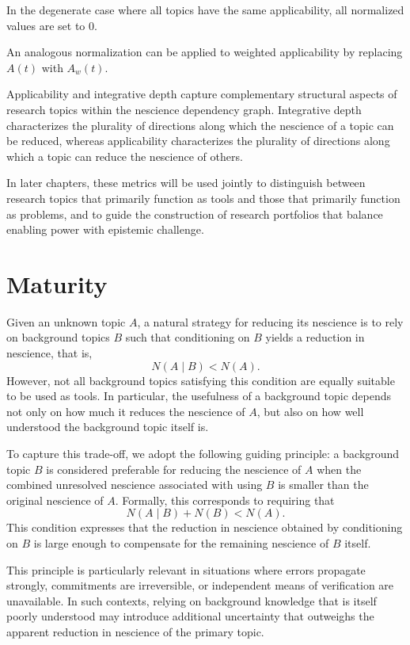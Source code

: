 \noindent
In the degenerate case where all topics have the same applicability, all normalized values are set to $0$.

An analogous normalization can be applied to weighted applicability by replacing $A(t)$ with $A_w(t)$.

Applicability and integrative depth capture complementary structural aspects of research topics within the nescience dependency graph. Integrative depth characterizes the plurality of directions along which the nescience of a topic can be reduced, whereas applicability characterizes the plurality of directions along which a topic can reduce the nescience of others.

In later chapters, these metrics will be used jointly to distinguish between research topics that primarily function as tools and those that primarily function as problems, and to guide the construction of research portfolios that balance enabling power with epistemic challenge.

%
%

\section{Maturity}
\label{sec:maturity}

Given an unknown topic $A$, a natural strategy for reducing its nescience is to rely on background topics $B$ such that conditioning on $B$ yields a reduction in nescience, that is,
\[
N(A \mid B) < N(A).
\]
However, not all background topics satisfying this condition are equally suitable to be used as tools. In particular, the usefulness of a background topic depends not only on how much it reduces the nescience of $A$, but also on how well understood the background topic itself is.

To capture this trade-off, we adopt the following guiding principle: a background topic $B$ is considered preferable for reducing the nescience of $A$ when the combined unresolved nescience associated with using $B$ is smaller than the original nescience of $A$. Formally, this corresponds to requiring that
\[
N(A \mid B) + N(B) < N(A).
\]
This condition expresses that the reduction in nescience obtained by conditioning on $B$ is large enough to compensate for the remaining nescience of $B$ itself.

This principle is particularly relevant in situations where errors propagate strongly, commitments are irreversible, or independent means of verification are unavailable. In such contexts, relying on background knowledge that is itself poorly understood may introduce additional uncertainty that outweighs the apparent reduction in nescience of the primary topic.

